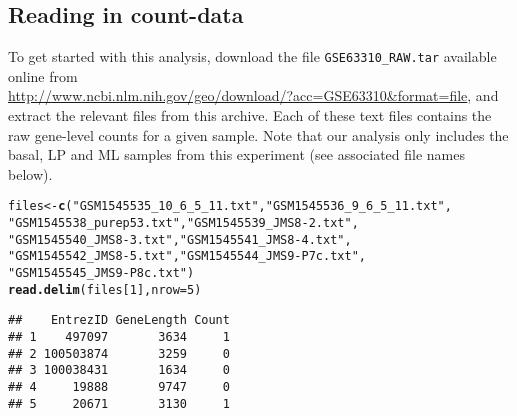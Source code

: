 \documentclass[10pt,a4paper]{extarticle}\usepackage[]{graphicx}\usepackage[]{color}
\makeatletter
\newcommand{\hlnum}[1]{\textcolor[rgb]{0.686,0.059,0.569}{#1}}%
\newcommand{\hlstr}[1]{\textcolor[rgb]{0.192,0.494,0.8}{#1}}%
\newcommand{\hlstd}[1]{\textcolor[rgb]{0.345,0.345,0.345}{#1}}%
\newcommand{\hlkwb}[1]{\textcolor[rgb]{0.69,0.353,0.396}{#1}}%
\newcommand{\hlkwc}[1]{\textcolor[rgb]{0.333,0.667,0.333}{#1}}%
\newcommand{\hlkwd}[1]{\textcolor[rgb]{0.737,0.353,0.396}{\textbf{#1}}}%
\newenvironment{kframe}{%
 \def\at@end@of@kframe{}%
 \ifinner\ifhmode%
  \def\at@end@of@kframe{\end{minipage}}%
  \begin{minipage}{\columnwidth}%
 \fi\fi%
 \def\FrameCommand##1{\hskip\@totalleftmargin \hskip-\fboxsep
 \colorbox{shadecolor}{##1}\hskip-\fboxsep
     \hskip-\linewidth \hskip-\@totalleftmargin \hskip\columnwidth}%
 \MakeFramed {\advance\hsize-\width
   \@totalleftmargin\z@ \linewidth\hsize
   \@setminipage}}%
 {\par\unskip\endMakeFramed%
 \at@end@of@kframe}
\newenvironment{knitrout}{}{} %
\makeatother
\begin{document}
\subsection*{Reading in count-data}

To get started with this analysis, download the file \texttt{GSE63310\_RAW.tar} available online from\\ \url{http://www.ncbi.nlm.nih.gov/geo/download/?acc=GSE63310&format=file}, and extract the relevant files from this archive. 
Each of these text files contains the raw gene-level counts for a given sample. Note that our analysis only includes the basal, LP and ML samples from this experiment (see associated file names below). 
\begin{knitrout}
\color{fgcolor}\begin{kframe}
\begin{alltt}
\hlstd{files} \hlkwb{<-} \hlkwd{c}\hlstd{(}\hlstr{"GSM1545535_10_6_5_11.txt"}\hlstd{,} \hlstr{"GSM1545536_9_6_5_11.txt"}\hlstd{,}
   \hlstr{"GSM1545538_purep53.txt"}\hlstd{,} \hlstr{"GSM1545539_JMS8-2.txt"}\hlstd{,}
   \hlstr{"GSM1545540_JMS8-3.txt"}\hlstd{,} \hlstr{"GSM1545541_JMS8-4.txt"}\hlstd{,}
   \hlstr{"GSM1545542_JMS8-5.txt"}\hlstd{,} \hlstr{"GSM1545544_JMS9-P7c.txt"}\hlstd{,}
   \hlstr{"GSM1545545_JMS9-P8c.txt"}\hlstd{)}
\hlkwd{read.delim}\hlstd{(files[}\hlnum{1}\hlstd{],} \hlkwc{nrow}\hlstd{=}\hlnum{5}\hlstd{)}
\end{alltt}
\begin{verbatim}
##    EntrezID GeneLength Count
## 1    497097       3634     1
## 2 100503874       3259     0
## 3 100038431       1634     0
## 4     19888       9747     0
## 5     20671       3130     1
\end{verbatim}
\end{kframe}
\end{knitrout}
\end{document}
